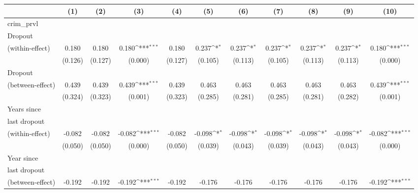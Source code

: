 {
\def\sym#1{\ifmmode^{#1}\else\(^{#1}\)\fi}
\begin{tabular}{l*{10}{c}}
\toprule
                &\multicolumn{1}{c}{(1)}         &\multicolumn{1}{c}{(2)}         &\multicolumn{1}{c}{(3)}         &\multicolumn{1}{c}{(4)}         &\multicolumn{1}{c}{(5)}         &\multicolumn{1}{c}{(6)}         &\multicolumn{1}{c}{(7)}         &\multicolumn{1}{c}{(8)}         &\multicolumn{1}{c}{(9)}         &\multicolumn{1}{c}{(10)}         \\
\midrule
crim\_prvl       &                  &                  &                  &                  &                  &                  &                  &                  &                  &                  \\
Dropout \\ (within-effect)&    0.180         &    0.180         &    0.180\sym{***}&    0.180         &    0.237\sym{*}  &    0.237\sym{*}  &    0.237\sym{*}  &    0.237\sym{*}  &    0.237\sym{*}  &    0.180\sym{***}\\
                &  (0.126)         &  (0.127)         &  (0.000)         &  (0.127)         &  (0.105)         &  (0.113)         &  (0.105)         &  (0.113)         &  (0.113)         &  (0.000)         \\
\addlinespace
Dropout \\ (between-effect)&    0.439         &    0.439         &    0.439\sym{***}&    0.439         &    0.463         &    0.463         &    0.463         &    0.463         &    0.463         &    0.439\sym{***}\\
                &  (0.324)         &  (0.323)         &  (0.001)         &  (0.323)         &  (0.285)         &  (0.281)         &  (0.285)         &  (0.281)         &  (0.282)         &  (0.001)         \\
\addlinespace
Years since \\ last dropout \\ (within-effect)&   -0.082         &   -0.082         &   -0.082\sym{***}&   -0.082         &   -0.098\sym{*}  &   -0.098\sym{*}  &   -0.098\sym{*}  &   -0.098\sym{*}  &   -0.098\sym{*}  &   -0.082\sym{***}\\
                &  (0.050)         &  (0.050)         &  (0.000)         &  (0.050)         &  (0.039)         &  (0.043)         &  (0.039)         &  (0.043)         &  (0.043)         &  (0.000)         \\
\addlinespace
Year since \\ last dropout \\ (between-effect)&   -0.192         &   -0.192         &   -0.192\sym{***}&   -0.192         &   -0.176         &   -0.176         &   -0.176         &   -0.176         &   -0.176         &   -0.192\sym{***}\\

\end{tabular}}
